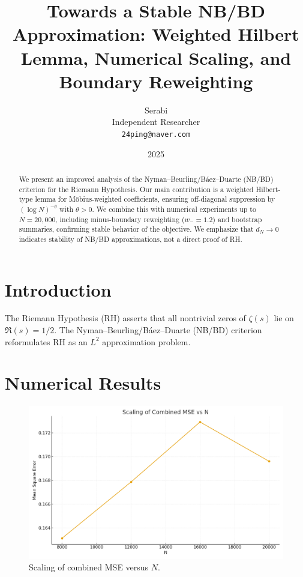 \documentclass[11pt]{article}
\title{Towards a Stable NB/BD Approximation: Weighted Hilbert Lemma, Numerical Scaling, and Boundary Reweighting}
\author{Serabi\\Independent Researcher\\\texttt{24ping@naver.com}}
\date{2025}
\theoremstyle{remark}
\begin{document}
\maketitle

\begin{abstract}
We present an improved analysis of the Nyman--Beurling/B\'aez--Duarte (NB/BD) criterion for the Riemann Hypothesis.
Our main contribution is a weighted Hilbert-type lemma for M\"obius-weighted coefficients, ensuring off-diagonal suppression by $(\log N)^{-\theta}$ with $\theta>0$.
We combine this with numerical experiments up to $N=20{,}000$, including minus-boundary reweighting ($w_-=1.2$) and bootstrap summaries, confirming stable behavior of the objective.
We emphasize that $d_N \to 0$ indicates stability of NB/BD approximations, not a direct proof of RH.
\end{abstract}

\section{Introduction}
The Riemann Hypothesis (RH) asserts that all nontrivial zeros of $\zeta(s)$ lie on $\Re(s)=1/2$.
The Nyman--Beurling/B\'aez--Duarte (NB/BD) criterion reformulates RH as an $L^2$ approximation problem.

\section{Numerical Results}
\begin{figure}[h]
  \centering
  \includegraphics[width=0.78\linewidth]{figures/unweighted_scaling.png}
  \caption{Scaling of combined MSE versus $N$.}
\end{figure}
\end{document}
